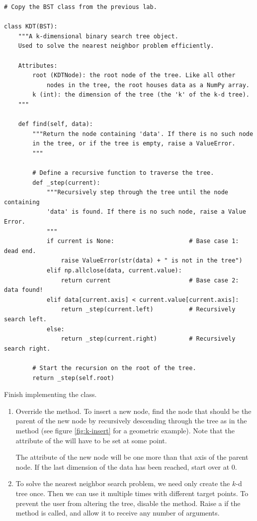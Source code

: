 \begin{lstlisting}
# Copy the BST class from the previous lab.

class KDT(BST):
    """A k-dimensional binary search tree object.
    Used to solve the nearest neighbor problem efficiently.

    Attributes:
        root (KDTNode): the root node of the tree. Like all other
            nodes in the tree, the root houses data as a NumPy array.
        k (int): the dimension of the tree (the 'k' of the k-d tree).
    """

    def find(self, data):
        """Return the node containing 'data'. If there is no such node
        in the tree, or if the tree is empty, raise a ValueError.
        """

        # Define a recursive function to traverse the tree.
        def _step(current):
            """Recursively step through the tree until the node containing
            'data' is found. If there is no such node, raise a Value Error.
            """
            if current is None:                     # Base case 1: dead end.
                raise ValueError(str(data) + " is not in the tree")
            elif np.allclose(data, current.value):
                return current                      # Base case 2: data found!
            elif data[current.axis] < current.value[current.axis]:
                return _step(current.left)          # Recursively search left.
            else:
                return _step(current.right)         # Recursively search right.

        # Start the recursion on the root of the tree.
        return _step(self.root)
\end{lstlisting}

\begin{problem} %
Finish implementing the  class.
\begin{enumerate}
\item Override the  method.
To insert a new node, find the node that should be the parent of the new node by recursively descending through the tree as in the  method (see figure \ref{fig:k-insert} for a geometric example).
Note that the  attribute of the will have to be set at some point.

The  attribute of the new node will be one more than that axis of the parent node.
If the last dimension of the data has been reached, start  over at 0.

\item To solve the nearest neighbor search problem, we need only create the $k$-d tree once.
Then we can use it multiple times with different target points.
To prevent the user from altering the tree, disable the  method.
Raise a  if the method is called, and allow it to receive any number of arguments.
\end{enumerate}
\end{problem}

